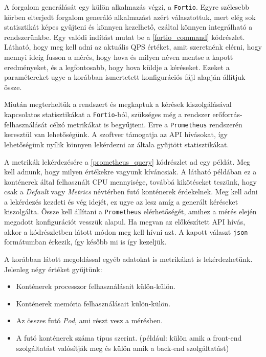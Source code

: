 A forgalom generálását egy külön alkalmazás végzi, a \verb+Fortio+. Egyre szélesebb körben elterjedt forgalom generáló alkalmazást azért választottuk, mert elég sok statisztikát képes gyűjteni és könnyen kezelhető, ezáltal könnyen integrálható a rendszerünkbe. Egy valódi indítást mutat be a  \ref{fortio_command} kódrészlet. 
Látható, hogy meg kell adni az aktuális QPS értéket, amit szeretnénk elérni, hogy mennyi ideig fusson a mérés, hogy hova és milyen néven mentse a kapott eredményeket, és a legfontosabb, hogy hova küldje a kéréseket.
Ezeket a paramétereket ugye a korábban ismertetett konfigurációs fájl alapján állítjuk össze. \\



Miután megterheltük a rendszert és megkaptuk a kérések kiszolgálásával kapcsolatos statisztikákat a \verb+Fortio+-ból, szükséges még a rendszer erőforrás-felhasználását célzó metrikákat is begyűjteni. 
Erre a \verb+Prometheus+ rendszerén keresztül van lehetőségünk.
A szoftver támogatja az API hívásokat, így lehetőségünk nyílik könnyen lekérdezni az általa gyűjtött statisztikákat. 

A metrikák lekérdezésére a \ref{prometheus_query} kódrészlet ad egy példát. Meg kell adnunk, hogy milyen értékekre vagyunk kíváncsiak. A látható példában ez a konténerek által felhasznált CPU mennyisége, továbbá kikötéseket teszünk, hogy csak a \textit{Default} vagy \textit{Metrics} névtérben futó konténerek érdekelnek.
Meg kell adni a lekérdezés kezdeti és vég idejét, ez ugye az lesz amíg a generált kéréseket kiszolgálta.
Össze kell állítani a \verb+Prometheus+ elérhetőségét, amihez a mérés elején megadott konfigurációt vesszük alapul. Ha megvan az előkészített API hívás, akkor a kódrészletben látott módon meg kell hívni azt. A kapott választ \verb+json+ formátumban érkezik, így később mi is így kezeljük. \\




A korábban látott megoldással egyéb adatokat is metrikákat is lekérdezhetünk. Jelenleg négy értéket gyűjtünk:
\begin{itemize}
  \item Konténerek processzor felhasználásait külön-külön.
  \item Konténerek memória felhasználásait külön-külön.
  \item Az összes futó \textit{Pod}, ami részt vesz a mérésben.
  \item A futó konténerek száma típus szerint. (például: külön amik a front-end szolgáltatást valósítják meg és külön amik a back-end szolgáltatást)
\end{itemize}

